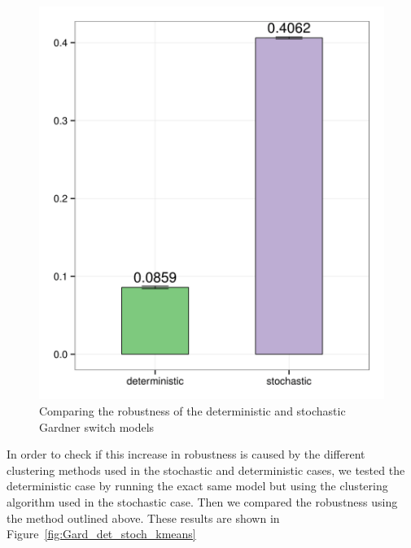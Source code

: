 \begin{figure}[h]
\centering
\includegraphics[scale=0.2]{chapterModelling/images/Gardner/robustness_comparison_det_stch.png}
\caption{Comparing the robustness of the deterministic and stochastic Gardner switch models}
\label{fig:Gard_robst}
\end{figure}



In order to check if this increase in robustness is caused by the different clustering methods used in the stochastic and deterministic cases, we tested the deterministic case by running the exact same model but using the clustering algorithm used in the stochastic case. Then we compared the robustness using the method outlined above. These results are shown in Figure~\ref{fig:Gard_det_stoch_kmeans}

